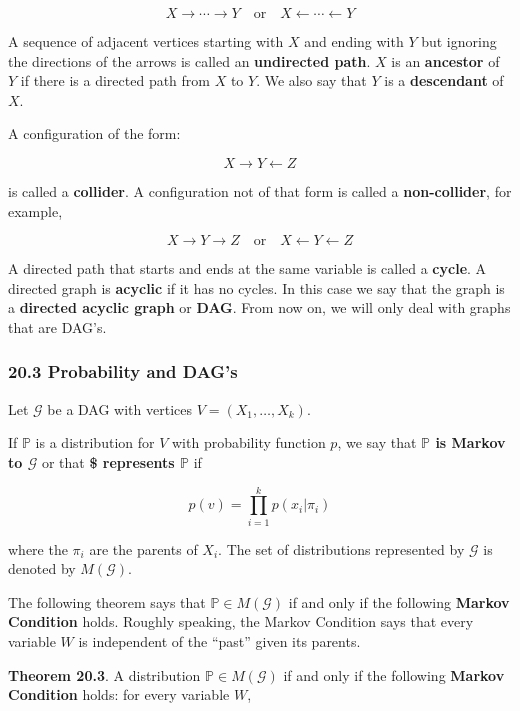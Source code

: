 \[ X \rightarrow \cdots \rightarrow Y
\quad \text{or} \quad
X \leftarrow \cdots \leftarrow Y \]

A sequence of adjacent vertices starting with \(X\) and ending with
\(Y\) but ignoring the directions of the arrows is called an
\textbf{undirected path}. \(X\) is an \textbf{ancestor} of \(Y\) if
there is a directed path from \(X\) to \(Y\). We also say that \(Y\) is
a \textbf{descendant} of \(X\).

A configuration of the form:

\[ X \rightarrow Y \leftarrow Z \]

is called a \textbf{collider}. A configuration not of that form is
called a \textbf{non-collider}, for example,

\[ X \rightarrow Y \rightarrow Z
\quad \text{or} \quad
X \leftarrow Y \leftarrow Z\]

A directed path that starts and ends at the same variable is called a
\textbf{cycle}. A directed graph is \textbf{acyclic} if it has no
cycles. In this case we say that the graph is a \textbf{directed acyclic
graph} or \textbf{DAG}. From now on, we will only deal with graphs that
are DAG's.

\subsubsection{20.3 Probability and DAG's}\label{probability-and-dags}

Let \(\mathcal{G}\) be a DAG with vertices \(V = (X_1, \dots, X_k)\).

If \(\mathbb{P}\) is a distribution for \(V\) with probability function
\(p\), we say that \textbf{\(\mathbb{P}\) is Markov to \(\mathcal{G}\)}
or that \textbf{\$ represents \(\mathbb{P}\)} if

\[ p(v) = \prod_{i=1}^k p(x_i | \pi_i) \]

where the \(\pi_i\) are the parents of \(X_i\). The set of distributions
represented by \(\mathcal{G}\) is denoted by \(M(\mathcal{G})\).

The following theorem says that \(\mathbb{P} \in M(\mathcal{G})\) if and
only if the following \textbf{Markov Condition} holds. Roughly speaking,
the Markov Condition says that every variable \(W\) is independent of
the ``past'' given its parents.

\textbf{Theorem 20.3}. A distribution \(\mathbb{P} \in M(\mathcal{G})\)
if and only if the following \textbf{Markov Condition} holds: for every
variable \(W\),

